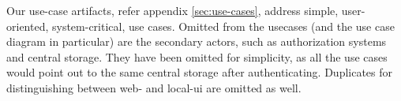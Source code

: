 Our use-case artifacts, refer appendix \ref{sec:use-cases}, address simple, user-oriented, system-critical, use cases.
Omitted from the usecases (and the use case diagram in particular) are the secondary actors, such as authorization systems and central storage.
They have been omitted for simplicity, as all the use cases would point out to the same central storage after authenticating. Duplicates for distinguishing between web- and local-ui are omitted as well.